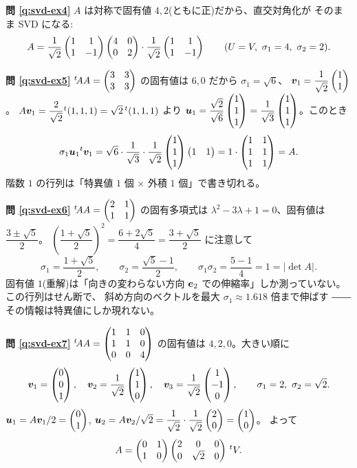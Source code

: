 \bigskip
\noindent\textbf{問 \ref{q:svd-ex4}}\quad
$A$ は対称で固有値 $4, 2$(ともに正)だから、直交対角化が
そのまま SVD になる:
\[
A = \frac{1}{\sqrt{2}}\begin{pmatrix}1 & 1 \\ 1 & -1\end{pmatrix}\begin{pmatrix}4 & 0 \\ 0 & 2\end{pmatrix}
\cdot\frac{1}{\sqrt{2}}\begin{pmatrix}1 & 1 \\ 1 & -1\end{pmatrix}
\qquad (U = V,\ \sigma_1 = 4,\ \sigma_2 = 2).
\]

\bigskip
\noindent\textbf{問 \ref{q:svd-ex5}}\quad
${}^t\!AA = \begin{pmatrix}3 & 3 \\ 3 & 3\end{pmatrix}$ の固有値は $6, 0$ だから
$\sigma_1 = \sqrt{6}$、
$\bm{v}_1 = \dfrac{1}{\sqrt{2}}\begin{pmatrix}1 \\ 1\end{pmatrix}$。
$A\bm{v}_1 = \dfrac{2}{\sqrt{2}}{}^t(1, 1, 1) = \sqrt{2}\,{}^t(1,1,1)$ より
$\bm{u}_1 = \dfrac{\sqrt{2}}{\sqrt{6}}\begin{pmatrix}1 \\ 1 \\ 1\end{pmatrix}
= \dfrac{1}{\sqrt{3}}\begin{pmatrix}1 \\ 1 \\ 1\end{pmatrix}$。このとき
\[
\sigma_1\bm{u}_1{}^t\bm{v}_1
= \sqrt{6}\cdot\frac{1}{\sqrt{3}}\cdot\frac{1}{\sqrt{2}}
\begin{pmatrix}1 \\ 1 \\ 1\end{pmatrix}\begin{pmatrix}1 & 1\end{pmatrix}
= 1 \cdot \begin{pmatrix}1 & 1 \\ 1 & 1 \\ 1 & 1\end{pmatrix} = A.
\]
階数 $1$ の行列は「特異値 $1$ 個 $\times$ 外積 $1$ 個」で書き切れる。

\bigskip
\noindent\textbf{問 \ref{q:svd-ex6}}\quad
${}^t\!AA = \begin{pmatrix}2 & 1 \\ 1 & 1\end{pmatrix}$ の固有多項式は
$\lambda^2 - 3\lambda + 1 = 0$、固有値は $\dfrac{3 \pm \sqrt{5}}{2}$。
$\left(\dfrac{1 + \sqrt{5}}{2}\right)^2 = \dfrac{6 + 2\sqrt{5}}{4}
= \dfrac{3 + \sqrt{5}}{2}$ に注意して
\[
\sigma_1 = \frac{1 + \sqrt{5}}{2}, \qquad \sigma_2 = \frac{\sqrt{5} - 1}{2},
\qquad
\sigma_1\sigma_2 = \frac{5 - 1}{4} = 1 = |\det A|.
\]
固有値 $1$(重解)は「向きの変わらない方向 $\bm{e}_2$
での伸縮率」しか測っていない。この行列はせん断で、
斜め方向のベクトルを最大 $\sigma_1 \approx 1.618$ 倍まで伸ばす
――その情報は特異値にしか現れない。

\bigskip
\noindent\textbf{問 \ref{q:svd-ex7}}\quad
${}^t\!AA = \begin{pmatrix}1 & 1 & 0 \\ 1 & 1 & 0 \\ 0 & 0 & 4\end{pmatrix}$ の固有値は
$4, 2, 0$。大きい順に
\[
\bm{v}_1 = \begin{pmatrix}0 \\ 0 \\ 1\end{pmatrix}, \quad
\bm{v}_2 = \frac{1}{\sqrt{2}}\begin{pmatrix}1 \\ 1 \\ 0\end{pmatrix}, \quad
\bm{v}_3 = \frac{1}{\sqrt{2}}\begin{pmatrix}1 \\ -1 \\ 0\end{pmatrix}, \qquad
\sigma_1 = 2,\ \sigma_2 = \sqrt{2}.
\]
$\bm{u}_1 = A\bm{v}_1/2 = \begin{pmatrix}0 \\ 1\end{pmatrix}$,
$\bm{u}_2 = A\bm{v}_2/\sqrt{2}
= \dfrac{1}{\sqrt{2}}\cdot\dfrac{1}{\sqrt{2}}\begin{pmatrix}2 \\ 0\end{pmatrix} = \begin{pmatrix}1 \\ 0\end{pmatrix}$。
よって
\[
A = \begin{pmatrix}0 & 1 \\ 1 & 0\end{pmatrix}\begin{pmatrix}2 & 0 & 0 \\ 0 & \sqrt{2} & 0\end{pmatrix}\,{}^tV.
\]

